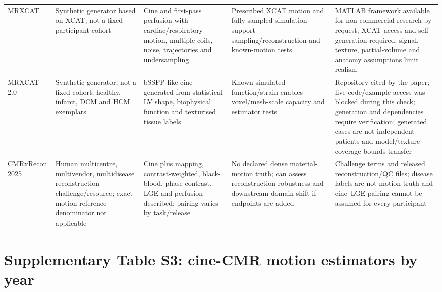 \documentclass[11pt,a4paper]{article}
\begin{document}
{\begin{longtable}{L{0.127\textwidth}L{0.162\textwidth}L{0.173\textwidth}L{0.196\textwidth}L{0.266\textwidth}}
\addlinespace
MRXCAT~\cite{wissmann2014mrxcat} & Synthetic generator based on XCAT; not a fixed participant cohort & Cine and first-pass perfusion with cardiac/respiratory motion, multiple coils, noise, trajectories and undersampling & Prescribed XCAT motion and fully sampled simulation support sampling/reconstruction and known-motion tests & MATLAB framework available for non-commercial research by request; XCAT access and self-generation required; signal, texture, partial-volume and anatomy assumptions limit realism \\
\addlinespace
MRXCAT 2.0~\cite{mrxcat2023,mrxcat2repo} & Synthetic generator, not a fixed cohort; healthy, infarct, DCM and HCM exemplars & bSSFP-like cine generated from statistical LV shape, biophysical function and texturised tissue labels & Known simulated function/strain enables voxel/mesh-scale capacity and estimator tests & Repository cited by the paper; live code/example access was blocked during this check; generation and dependencies require verification; generated cases are not independent patients and model/texture coverage bounds transfer \\
\addlinespace
CMRxRecon 2025~\cite{cmrxrecon2025official} & Human multicentre, multivendor, multidisease reconstruction challenge/resource; exact motion-reference denominator not applicable & Cine plus mapping, contrast-weighted, black-blood, phase-contrast, LGE and perfusion described; pairing varies by task/release & No declared dense material-motion truth; can assess reconstruction robustness and downstream domain shift if endpoints are added & Challenge terms and released reconstruction/QC files; disease labels are not motion truth and cine--LGE pairing cannot be assumed for every participant \\
\bottomrule
\end{longtable}
}

\section*{Supplementary Table S3: cine-CMR motion estimators by year}
\end{document}
